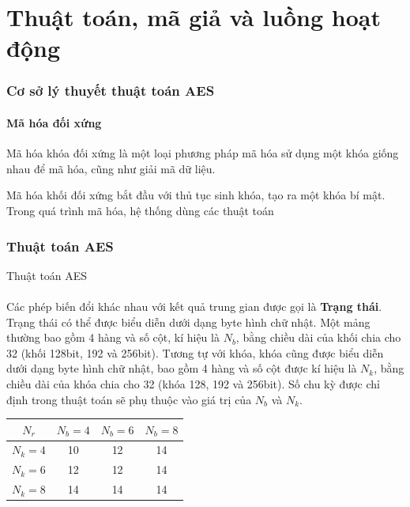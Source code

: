
\chapter{Thuật toán, mã giả và luồng hoạt động}
\subsection{Cơ sở lý thuyết thuật toán AES}

\subsubsection{Mã hóa đối xứng}

Mã hóa khóa đối xứng là một loại phương pháp mã hóa sử dụng một khóa giống nhau để mã hóa, cũng như giải mã dữ liệu.

Mã hóa khối đối xứng bắt đầu với thủ tục sinh khóa, tạo ra một khóa bí mật. Trong quá trình mã hóa, hệ thống dùng các thuật toán 


\subsection{Thuật toán AES}

Thuật toán AES 

\subsubsection{}
Các phép biến đổi khác nhau với kết quả trung gian được gọi là \textbf{Trạng thái}. Trạng thái có thể được biểu diễn dưới dạng byte hình chữ nhật. Một mảng thường bao gồm 4 hàng và số cột, kí hiệu là $N_b$, bằng chiều dài của khối chia cho 32 (khối 128bit, 192 và 256bit). Tương tự với khóa, khóa cũng được biểu diễn dưới dạng byte hình chữ nhật, bao gồm 4 hàng và số cột được kí hiệu là $N_k$, bằng chiều dài của khóa chia cho 32 (khóa 128, 192 và 256bit). Số chu kỳ được chỉ định trong thuật toán sẽ phụ thuộc vào giá trị của $N_b$ và $N_k$.\quad

\begin{table}[h]
	\centering
	\begin{tabular}{|c|c|c|c|}
		\hline
		$N_r$ & $N_b = 4$ & $N_b = 6$ & $N_b = 8$ \\ \hline
		$N_k = 4$ & 10 & 12 & 14 \\ \hline
		$N_k = 6$ & 12 & 12 & 14 \\ \hline
		$N_k = 8$ & 14 & 14 & 14 \\ \hline
	\end{tabular}
\end{table}

